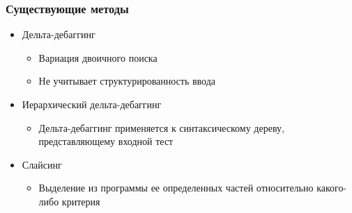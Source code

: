 
\begin{frame}
	\frametitle{Существующие методы}
		\begin{itemize}
			\item Дельта-дебаггинг
				\begin{itemize}
					\item Вариация двоичного поиска
					\item Не учитывает структурированность ввода
				\end{itemize}
			\item Иерархический дельта-дебаггинг
				\begin{itemize}
					\item Дельта-дебаггинг применяется к синтаксическому дереву, представляющему входной тест
				\end{itemize}
			\item Слайсинг
				\begin{itemize}
					\item Выделение из программы ее определенных частей относительно какого-либо критерия
				\end{itemize}
		\end{itemize}
\end{frame}
	


